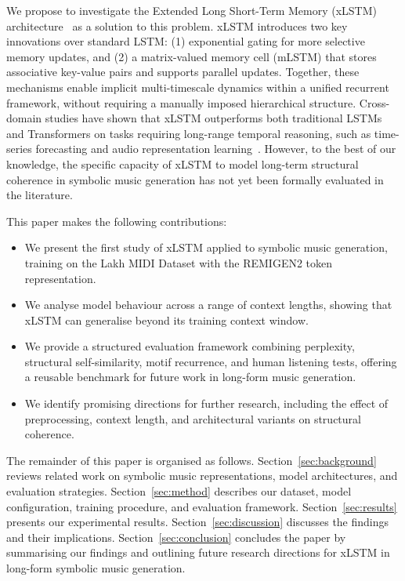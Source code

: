 \documentclass[conference]{IEEEtran}
\begin{document}
We propose to investigate the Extended Long Short-Term Memory (xLSTM) architecture~\cite{beck2024} as a solution to this problem. xLSTM introduces two key innovations over standard LSTM: (1) exponential gating for more selective memory updates, and (2) a matrix-valued memory cell (mLSTM) that stores associative key-value pairs and supports parallel updates. Together, these mechanisms enable implicit multi-timescale dynamics within a unified recurrent framework, without requiring a manually imposed hierarchical structure. Cross-domain studies have shown that xLSTM outperforms both traditional LSTMs and Transformers on tasks requiring long-range temporal reasoning, such as time-series forecasting and audio representation learning~\cite{alharthi2024, axlstm2024}. However, to the best of our knowledge, the specific capacity of xLSTM to model long-term structural coherence in symbolic music generation has not yet been formally evaluated in the literature.

This paper makes the following contributions:
\begin{itemize}
    \item We present the first study of xLSTM applied to symbolic music generation, training on the Lakh MIDI Dataset with the REMIGEN2 token representation.
    \item We analyse model behaviour across a range of context lengths, showing that xLSTM can generalise beyond its training context window.
    \item We provide a structured evaluation framework combining perplexity, structural self-similarity, motif recurrence, and human listening tests, offering a reusable benchmark for future work in long-form music generation.
    \item We identify promising directions for further research,
    including the effect of preprocessing, context length, and
    architectural variants on structural coherence.
\end{itemize}

The remainder of this paper is organised as follows.
Section~\ref{sec:background} reviews related work on symbolic music representations, model architectures, and evaluation strategies.
Section~\ref{sec:method} describes our dataset, model configuration, training procedure, and evaluation framework.
Section~\ref{sec:results} presents our experimental results.
Section~\ref{sec:discussion} discusses the findings and their
implications.
Section~\ref{sec:conclusion} concludes the paper by summarising our findings and outlining future research directions for xLSTM in long-form symbolic music generation.
\end{document}
